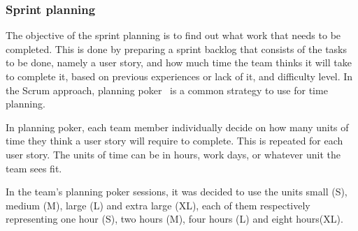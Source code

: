 \begin{comment}

The assignment at hand will demand innovation and most likely result in frequent changes throughout the entire duration of the project.

What the team needs is to follow the guidelines of an agile development framework. First and foremost it must also be a development framework that is known to the team, so that a minimum of time will be spent trying to learn a new process. The standard and obvious choice is to follow the Scrum model. All the members of the team have previous experience with Scrum from the course IT1901.

The Scrum model is an iterative and incremental agile software development framework. The main principle is that a small team is to focus on reaching a common goal.

The Scrum process consists of iterations of sprints that has a duration one to four weeks. Each sprint has three important parts.
The first part is the planning meeting~\ref{sec:sprintplanning}, then begins the daily  meetings~\ref{sec:dailymeeting}, and finally, the process is concluded with an end meeting~\ref{sec:endmeeting}.

In this section, the concept behind the Scrum process will be thoroughly explained. The team's project process will be reviewed in detail in chapter~\ref{sec:sprints}.
\end{comment}

\subsubsection{Sprint planning}
\label{sec:sprintplanning}
The objective of the sprint planning is to find out what work that needs to be
completed. This is done by preparing a sprint backlog that consists of the tasks
to be done, namely a user story, and how much time the team thinks it will take to complete it, based on previous experiences or lack of it, and difficulty level. In the Scrum approach, planning poker~\cite{planningpoker} is a common strategy to use for time planning.

In planning poker, each team member individually decide on how many units of
time they think a user story will require to complete. This is repeated for each
user story. The units of time can be in hours, work days, or whatever unit the team sees fit.

In the team's planning poker sessions, it was decided to use the units small (S), medium (M), large (L) and extra
large (XL), each of them respectively representing one hour (S), two hours (M), four hours (L) and eight hours(XL).

